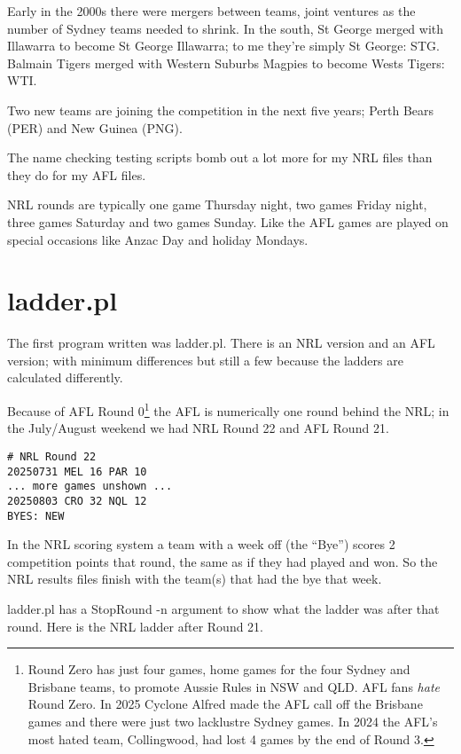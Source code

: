 \documentclass{article}
\begin{document}
Early in the 2000s there were mergers between teams, joint ventures as
the number of Sydney teams needed to shrink. In the south, St George
merged with Illawarra to become St George Illawarra; to me they're
simply St George: STG. Balmain Tigers merged with Western Suburbs
Magpies to become Wests Tigers: WTI.

Two new teams are joining the competition in the next five years;
Perth Bears (PER) and New Guinea (PNG).

The name checking testing scripts bomb out a lot more for my NRL files
than they do for my AFL files.

NRL rounds are typically one game Thursday night, two games Friday
night, three games Saturday and two games Sunday. Like the AFL games
are played on special occasions like Anzac Day and holiday Mondays.

\section{ladder.pl}

The first program written was ladder.pl. There is an NRL version and
an AFL version; with minimum differences but still a few because the
ladders are calculated differently.

Because of AFL Round 0\footnote{Round Zero has just four games, home
games for the four Sydney and Brisbane teams, to promote
Aussie Rules in NSW and QLD.  AFL fans \emph{hate}
Round Zero. In 2025 Cyclone Alfred made the AFL call off the
Brisbane games and there were just two lacklustre Sydney games.
In 2024 the AFL's most hated team, Collingwood, had lost 4 games by
the end of Round 3.} the AFL is numerically one round behind the NRL;
in the July/August weekend we had NRL Round 22 and AFL Round 21.

\begin{verbatim}
# NRL Round 22
20250731 MEL 16 PAR 10
... more games unshown ...
20250803 CRO 32 NQL 12
BYES: NEW
\end{verbatim}

In the NRL scoring system a team with a week off (the ``Bye'') scores
2 competition points that round, the same as if they had played and
won. So the NRL results files finish with the team(s) that had the bye
that week.

ladder.pl has a StopRound -n argument to show what the ladder was
after that round. Here is the NRL ladder after Round 21.
\end{document}
